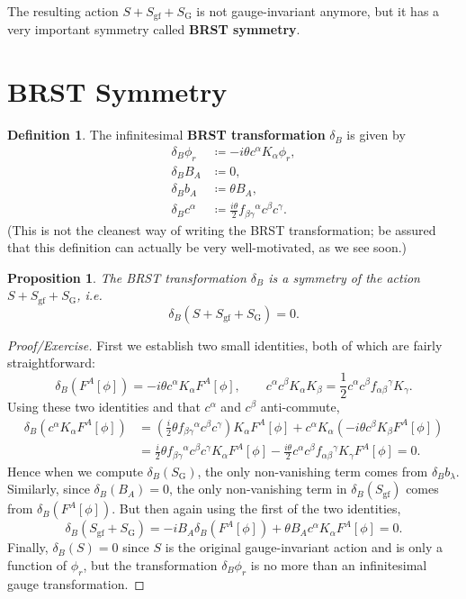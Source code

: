 \documentclass{report}
\theoremstyle{plain}
\newtheorem{proposition}[theorem]{Proposition}
\theoremstyle{definition}
\newtheorem{definition}[theorem]{Definition}
\theoremstyle{remark}
\begin{document}
The resulting action $S + S_{\text{gf}} + S_{\text{G}}$ is not
gauge-invariant anymore, but it has a very important symmetry called
{\bf BRST symmetry}.

\section{BRST Symmetry}

\begin{definition}
  The infinitesimal {\bf BRST transformation} $\delta_B$ is given by
  \begin{align*}
    \delta_B\phi_r &\coloneqq -i\theta c^\alpha K_\alpha\phi_r, \\
    \delta_B B_A &\coloneqq 0, \\
    \delta_B b_A &\coloneqq \theta B_A, \\
    \delta_B c^\alpha &\coloneqq \frac{i\theta}{2} f_{\beta\gamma}{}^\alpha c^\beta c^\gamma.
  \end{align*}
  (This is not the cleanest way of writing the BRST transformation; be
  assured that this definition can actually be very well-motivated, as
  we see soon.)
\end{definition}

\begin{proposition}
  The BRST transformation $\delta_B$ is a symmetry of the action $S +
  S_{\text{gf}} + S_{\text{G}}$, i.e.
  \[ \delta_B(S + S_{\text{gf}} + S_{\text{G}}) = 0. \]
\end{proposition}

\begin{proof}[Proof/Exercise]
  First we establish two small identities, both of which are fairly
  straightforward:
  \[ \delta_B(F^A[\phi]) = -i\theta c^\alpha K_\alpha F^A[\phi], \qquad c^\alpha c^\beta K_\alpha K_\beta = \frac{1}{2} c^\alpha c^\beta f_{\alpha\beta}{}^\gamma K_\gamma. \]
  Using these two identities and that $c^\alpha$ and $c^\beta$
  anti-commute,
  \begin{align*}
    \delta_B(c^\alpha K_\alpha F^A[\phi])
    &= \left(\frac{i}{2}\theta f_{\beta\gamma}{}^\alpha c^\beta c^\gamma\right) K_\alpha F^A[\phi] + c^\alpha K_\alpha (-i\theta c^\beta K_\beta F^A[\phi]) \\
    &= \frac{i}{2}\theta f_{\beta\gamma}{}^\alpha c^\beta c^\gamma K_\alpha F^A[\phi] - \frac{i\theta}{2} c^\alpha c^\beta f_{\alpha\beta}{}^\gamma K_\gamma F^A[\phi] = 0.
  \end{align*}
  Hence when we compute $\delta_B(S_{\text{G}})$, the only
  non-vanishing term comes from $\delta_B b_\lambda$. Similarly, since
  $\delta_B(B_A) = 0$, the only non-vanishing term in
  $\delta_B(S_{\text{gf}})$ comes from $\delta_B(F^A[\phi])$. But then
  again using the first of the two identities,
  \[ \delta_B(S_{\text{gf}} + S_{\text{G}}) = -iB_A \delta_B(F^A[\phi]) + \theta B_A c^\alpha K_\alpha F^A[\phi] = 0. \]
  Finally, $\delta_B(S) = 0$ since $S$ is the original gauge-invariant
  action and is only a function of $\phi_r$, but the transformation
  $\delta_B \phi_r$ is no more than an infinitesimal gauge
  transformation.
\end{proof}
\end{document}
